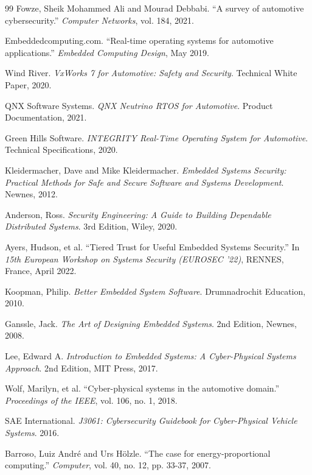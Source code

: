 \begin{thebibliography}{99}
Fowze, Sheik Mohammed Ali and Mourad Debbabi.
``A survey of automotive cybersecurity.''
\textit{Computer Networks}, vol. 184, 2021.

Embeddedcomputing.com.
``Real-time operating systems for automotive applications.''
\textit{Embedded Computing Design}, May 2019.

Wind River.
\textit{VxWorks 7 for Automotive: Safety and Security}.
Technical White Paper, 2020.

QNX Software Systems.
\textit{QNX Neutrino RTOS for Automotive}.
Product Documentation, 2021.

Green Hills Software.
\textit{INTEGRITY Real-Time Operating System for Automotive}.
Technical Specifications, 2020.

Kleidermacher, Dave and Mike Kleidermacher.
\textit{Embedded Systems Security: Practical Methods for Safe and Secure Software and Systems Development}.
Newnes, 2012.

Anderson, Ross.
\textit{Security Engineering: A Guide to Building Dependable Distributed Systems}.
3rd Edition, Wiley, 2020.

Ayers, Hudson, et al.
``Tiered Trust for Useful Embedded Systems Security.''
In \textit{15th European Workshop on Systems Security (EUROSEC '22)}, RENNES, France, April 2022.

Koopman, Philip.
\textit{Better Embedded System Software}.
Drumnadrochit Education, 2010.

Ganssle, Jack.
\textit{The Art of Designing Embedded Systems}.
2nd Edition, Newnes, 2008.

Lee, Edward A.
\textit{Introduction to Embedded Systems: A Cyber-Physical Systems Approach}.
2nd Edition, MIT Press, 2017.

Wolf, Marilyn, et al.
``Cyber-physical systems in the automotive domain.''
\textit{Proceedings of the IEEE}, vol. 106, no. 1, 2018.

SAE International.
\textit{J3061: Cybersecurity Guidebook for Cyber-Physical Vehicle Systems}.
2016.

Barroso, Luiz André and Urs Hölzle.
``The case for energy-proportional computing.''
\textit{Computer}, vol. 40, no. 12, pp. 33-37, 2007.


\end{thebibliography}
